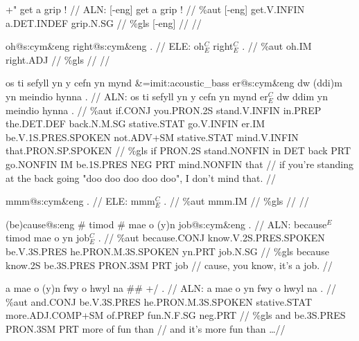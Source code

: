 \documentclass[a4paper,10pt]{article}
\begin{document}
\ex
\begingl[lingstyle=gergl]
\glchat +" get a grip ! //
\glsurface ALN: [-eng] get a grip !  //
\glauto \%aut [-eng] get{\scriptsize .V.INFIN} a{\scriptsize .DET.INDEF} grip{\scriptsize .N.SG}   //
\glmanual \%gls [-eng]      //
\gleng  //
\endgl
\xe

\ex
\begingl[lingstyle=gergl]
\glchat oh@s:cym\&eng right@s:cym\&eng . //
\glsurface ELE:  oh$^{C}_{E}$ right$^{C}_{E}$ .  //
\glauto \%aut  oh{\scriptsize .IM} right{\scriptsize .ADJ}   //
\glmanual \%gls      //
\gleng  //
\endgl
\xe

\ex
\begingl[lingstyle=gergl]
\glchat os ti sefyll yn y cefn yn mynd \&=imit:acoustic\_bass er@s:cym\&eng dw (ddi)m yn meindio hynna . //
\glsurface ALN:  os ti sefyll yn y cefn yn mynd er$^{C}_{E}$ dw ddim yn meindio hynna .  //
\glauto \%aut  if{\scriptsize .CONJ} you{\scriptsize .PRON.2S} stand{\scriptsize .V.INFIN} in{\scriptsize .PREP} the{\scriptsize .DET.DEF} back{\scriptsize .N.M.SG} stative{\scriptsize .STAT} go{\scriptsize .V.INFIN} er{\scriptsize .IM} be{\scriptsize .V.1S.PRES.SPOKEN} not{\scriptsize .ADV+SM} stative{\scriptsize .STAT} mind{\scriptsize .V.INFIN} that{\scriptsize .PRON.SP.SPOKEN}   //
\glmanual \%gls  if PRON{\scriptsize .2S} stand{\scriptsize .NONFIN} in DET back PRT go{\scriptsize .NONFIN} IM be{\scriptsize .1S.PRES} NEG PRT mind{\scriptsize .NONFIN} that   //
\gleng if you're standing at the back going "doo doo doo doo doo", I don't mind that. //
\endgl
\xe

\ex
\begingl[lingstyle=gergl]
\glchat mmm@s:cym\&eng . //
\glsurface ELE:  mmm$^{C}_{E}$ .  //
\glauto \%aut  mmm{\scriptsize .IM}   //
\glmanual \%gls     //
\gleng  //
\endgl
\xe

\ex
\begingl[lingstyle=gergl]
\glchat (be)cause@s:eng \# timod \# mae o (y)n job@s:cym\&eng . //
\glsurface ALN:  because$^{E}$ timod mae o yn job$^{C}_{E}$ .  //
\glauto \%aut  because{\scriptsize .CONJ} know{\scriptsize .V.2S.PRES.SPOKEN} be{\scriptsize .V.3S.PRES} he{\scriptsize .PRON.M.3S.SPOKEN} yn{\scriptsize .PRT} job{\scriptsize .N.SG}   //
\glmanual \%gls  because know{\scriptsize .2S} be{\scriptsize .3S.PRES} PRON{\scriptsize .3SM} PRT job   //
\gleng cause, you know, it's a job. //
\endgl
\xe

\ex
\begingl[lingstyle=gergl]
\glchat a mae o (y)n fwy o hwyl na \#\# +/ . //
\glsurface ALN:  a mae o yn fwy o hwyl na .  //
\glauto \%aut  and{\scriptsize .CONJ} be{\scriptsize .V.3S.PRES} he{\scriptsize .PRON.M.3S.SPOKEN} stative{\scriptsize .STAT} more{\scriptsize .ADJ.COMP+SM} of{\scriptsize .PREP} fun{\scriptsize .N.F.SG} neg{\scriptsize .PRT}   //
\glmanual \%gls  and be{\scriptsize .3S.PRES} PRON{\scriptsize .3SM} PRT more of fun than   //
\gleng and it's more fun than \dots  //
\endgl
\xe
\end{document}
